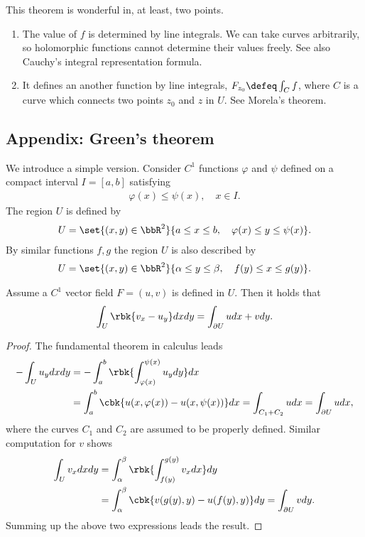 \documentclass[openany, a4paper, oneside]{jsbook}
\begin{document}
This theorem is wonderful in, at least, two points.
\begin{enumerate}
\item The value of $f$ is determined by line integrals.
We can take curves arbitrarily, so holomorphic functions cannot determine their values freely.
See also Cauchy's integral representation formula.
\item It defines an another function by line integrals, $F_{z_0} \defeq \int_{C} f$, where $C$ is a curve which connects two points $z_0$ and $z$ in $U$.
See Morela's theorem.
\end{enumerate}
\subsection{Appendix: Green's theorem}

We introduce a simple version.
Consider $C^1$ functions $\varphi$ and $\psi$ defined on a compact interval $I=[a, b]$ satisfying
\begin{align}
 \varphi (x) \leq \psi (x), \quad x \in I.
\end{align}
The region $U$ is defined by
\begin{align}
 U
 =
 \set{(x,y) \in \bbR^2}{a \leq x \leq b, \quad \varphi (x) \leq y \leq \psi (x)}.
\end{align}
By similar functions $f, g$ the region $U$ is also described by
\begin{align}
 U
 =
 \set{(x,y) \in \bbR^2}{\alpha \leq y \leq \beta, \quad f (y) \leq x \leq g (y)}.
\end{align}
\begin{thm}
 Assume a $C^1$ vector field $F = (u, v)$ is defined in $U$.
 Then it holds that
 \begin{align}
  \int_U \rbk{v_x - u_y} dx dy
  =
  \int_{\partial U} udx + vdy.
 \end{align}
\end{thm}
\begin{proof}
The fundamental theorem in calculus leads
\begin{align}
 -\int_U u_y dx dy
 &=
 -\int_a^b \rbk{\int_{\varphi (x)}^{\psi (x)} u_y dy} dx \\
 &=
 \int_a^b \cbk{u (x, \varphi (x)) - u (x, \psi (x))} dx
 =
 \int_{C_1 + C_2} u dx
 =
 \int_{\partial U} u dx,
\end{align}
where the curves $C_1$ and $C_2$ are assumed to be properly defined.
Similar computation for $v$ shows
\begin{align}
 \int_U v_x dx dy
 &=
 \int_{\alpha}^{\beta} \rbk{\int_{f (y)}^{g (y)} v_x dx} dy \\
 &=
 \int_{\alpha}^{\beta} \cbk{v (g (y), y) - u (f (y), y)} dy
 =
 \int_{\partial U} v dy.
\end{align}
Summing up the above two expressions leads the result.
\end{proof}
\end{document}
